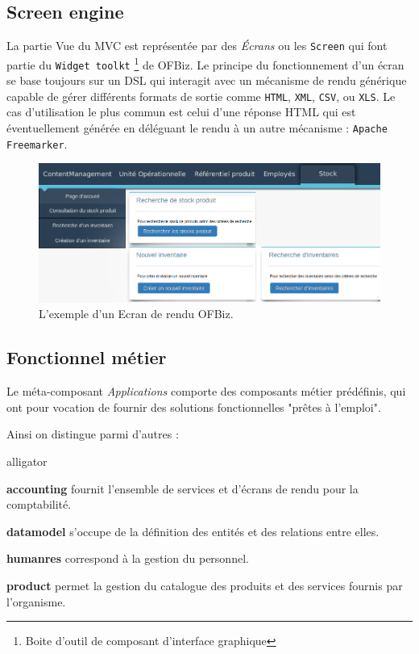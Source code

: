 \subsection{Screen engine}
La partie Vue du MVC est représentée par des \emph{Écrans} ou les \verb|Screen| qui font partie du \verb|Widget toolkt| \footnote{Boite d'outil de composant d'interface graphique} de OFBiz. Le principe du fonctionnement d'un écran se base toujours sur un DSL qui interagit avec un mécanisme de rendu générique capable de gérer différents formats de sortie comme \verb|HTML|, \verb|XML|, \verb|CSV|, ou \verb|XLS|. Le cas d'utilisation le plus commun est celui d'une réponse HTML qui est éventuellement générée en déléguant le rendu à un autre mécanisme : \verb|Apache Freemarker|.
\begin{figure}[h!]
	\includegraphics[width=\linewidth]{screenOfbiZ.png}
	\caption{L'exemple d'un Ecran de rendu OFBiz.}
	\label{fig:screen}
\end{figure}

\subsection{Fonctionnel métier}
Le méta-composant \emph{Applications} comporte des composants métier prédéfinis, qui ont pour vocation de fournir des solutions fonctionnelles "prêtes à l'emploi". 

Ainsi on distingue parmi d'autres :
\begin{labeling}{alligator}
	\item [\textbf{accounting}] fournit l'ensemble de services et d'écrans de rendu pour la comptabilité.
	\item [\textbf{datamodel}] s'occupe de la définition des entités et des relations entre elles.
	\item [\textbf{humanres}] correspond à la gestion du personnel.
	\item [\textbf{product}] permet la gestion du catalogue des produits et des services fournis par l'organisme.
\end{labeling}


